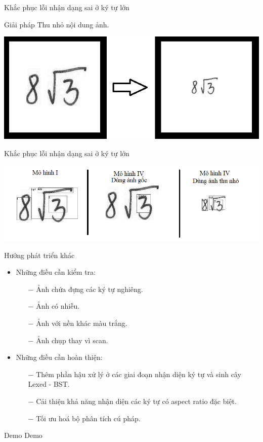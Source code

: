 \documentclass{beamer}
\begin{document}
	\begin{frame}{Khắc phục lỗi nhận dạng sai ở ký tự lớn}
		\begin{block}{Giải pháp}
			Thu nhỏ nội dung ảnh.
		\end{block}
		\begin{center}
			\centering
			\includegraphics[width=0.775\linewidth]{ensmall.png}
			\vspace{0.5cm}
		\end{center}
	\end{frame}
	
	\begin{frame}{Khắc phục lỗi nhận dạng sai ở ký tự lớn}
		\begin{center}
			\centering
			\includegraphics[width=0.875\linewidth]{compare_future.png}
			\vspace{0.5cm}
		\end{center}
	\end{frame}
	
	\begin{frame}{Hướng phát triển khác}
		\begin{itemize}
			\item Những điều cần kiểm tra:
			\begin{itemize}
				\item [$-$]Ảnh chứa đựng các ký tự nghiêng.
				\item [$-$]Ảnh có nhiễu.
				\item [$-$]Ảnh với nền khác màu trắng.
				\item [$-$]Ảnh chụp thay vì scan.
			\end{itemize}
			\item Những điều cần hoàn thiện:
			\begin{itemize}
				\item [$-$]Thêm phần hậu xử lý ở các giai đoạn nhận diện ký tự và sinh cây Lexed - BST.
				\item [$-$]Cải thiện khả năng nhận diện các ký tự có aspect ratio đặc biệt.
				\item [$-$]Tối ưu hoá bộ phân tích cú pháp. 
			\end{itemize}
		\end{itemize}
	\end{frame}
	\begin{frame}{Demo}
		\huge{Demo}
	\end{frame}
\end{document}
